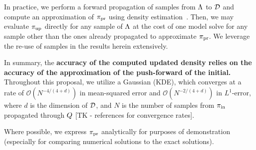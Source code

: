 In practice, we perform a forward propagation of samples from ${\Lambda}$ to $\mathcal{D}$ and compute an approximation of $\operatorname*{\pi_{pr}}$ using density estimation~\cite{BJW18}.
Then, we may evaluate $\operatorname*{\pi_{up}}$ directly for any sample of ${\Lambda}$ at the cost of one model solve for any sample other than the ones already propagated to approximate $\operatorname*{\pi_{pr}}$. 
We leverage the re-use of samples in the results herein extensively.

In summary, the \textbf{accuracy of the computed updated density relies on the accuracy of the approximation of the push-forward of the initial.}
Throughout this proposal, we utilize a Gaussian (KDE), which converges at a rate of $\mathcal{O}(N^{-4/(4+d)})$ in mean-squared error and $\mathcal{O}(N^{-2/(4+d)})$ in $L^1$-error, where $d$ is the dimension of $\mathcal{D}$, and $N$ is the number of samples from $\operatorname*{\pi_{in}}$ propagated through $Q$ [TK - references for convergence rates].

%
%
%


Where possible, we express $\operatorname*{\pi_{pr}}$ analytically for purposes of demonstration (especially for comparing numerical solutions to the exact solutions). 